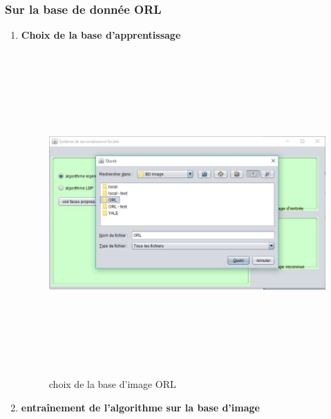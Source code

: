 	\subsubsection{Sur la base de donnée ORL}
	\begin{enumerate}
		\item \textbf{Choix de la base d'apprentissage}
		
		\begin{figure}[htbp]
			\centering
				\includegraphics[width=450pt,height=350pt]{choixORL.JPG}
			\caption{choix de la base d'image ORL}
			\label{fig:choixORL}
		\end{figure}
		\newpage
			\item \textbf{entraînement de l'algorithme sur la base d'image}
			

\end{enumerate}
